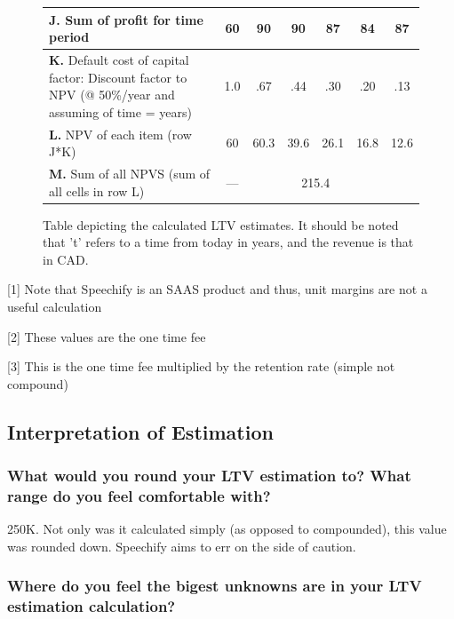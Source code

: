 \documentclass{article}
\begin{document}
\begin{figure}[ht!]
\begin{center}
\begin{tabular}{| p{6.5cm} | c | c | c | c | c | c |}
                    \\ \hline
                    \textbf{J.} Sum of profit for time period & 60 & 90 & 90 & 87 & 84 & 87
                    \\ \hline
                    \raggedright \textbf{K.} Default cost of capital factor: Discount factor to NPV (@ 50\%/year and assuming of time = years) & 1.0 & .67 & .44 & .30 & .20 & .13
                    \\ \hline
                    \textbf{L.} NPV of each item (row J*K) & 60 & 60.3 & 39.6 & 26.1 & 16.8 & 12.6
                    \\ \hline
                    \textbf{M.} Sum of all NPVS (sum of all cells in row L) & --- & \multicolumn{4}{c}{215.4} &
                    \\ \hline
                    
                \end{tabular}
                \caption{Table depicting the calculated LTV estimates. It should be noted that 't' refers to a time from today in years, and the revenue is that in CAD.}
            \end{center}
        \end{figure}
        
        \raggedright
        [1] Note that Speechify is an SAAS product and thus, unit margins are not a useful calculation

        [2] These values are the one time fee

        [3] This is the one time fee multiplied by the retention rate (simple not compound)

    \subsection{Interpretation of Estimation}

        \subsubsection{What would you round your LTV estimation to? What range do you feel comfortable with?}

        250K. Not only was it calculated simply (as opposed to compounded), this value was rounded down. Speechify aims to err on the side of caution. 

        \subsubsection{Where do you feel the bigest unknowns are in your LTV estimation calculation?}
\end{document}
